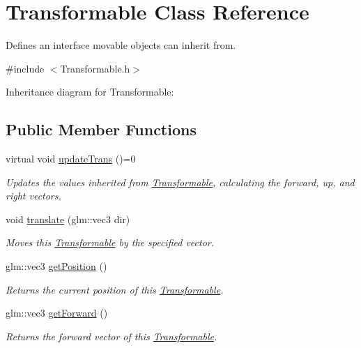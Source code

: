\hypertarget{class_transformable}{\section{Transformable Class Reference}
\label{class_transformable}
}


Defines an interface movable objects can inherit from.  




{\ttfamily \#include $<$Transformable.\-h$>$}



Inheritance diagram for Transformable\-:
\subsection*{Public Member Functions}
\begin{DoxyCompactItemize}
\item 
virtual void \hyperlink{class_transformable_a8c6ccb0dbe1f6ebc9136e5f6703b054c}{update\-Trans} ()=0
\begin{DoxyCompactList}\small\item\em Updates the values inherited from \hyperlink{class_transformable}{Transformable}, calculating the forward, up, and right vectors. \end{DoxyCompactList}\item 
void \hyperlink{class_transformable_a3a590cb8c06786ee522e0bfb60fb5ab0}{translate} (glm\-::vec3 dir)
\begin{DoxyCompactList}\small\item\em Moves this \hyperlink{class_transformable}{Transformable} by the specified vector. \end{DoxyCompactList}\item 
glm\-::vec3 \hyperlink{class_transformable_af3a1fdab3b62c089409a8079af370e98}{get\-Position} ()
\begin{DoxyCompactList}\small\item\em Returns the current position of this \hyperlink{class_transformable}{Transformable}. \end{DoxyCompactList}\item 
glm\-::vec3 \hyperlink{class_transformable_ae985510704d40ebeb27b088438b3f779}{get\-Forward} ()
\begin{DoxyCompactList}\small\item\em Returns the forward vector of this \hyperlink{class_transformable}{Transformable}. \end{DoxyCompactList}\item 

\end{DoxyCompactItemize}
